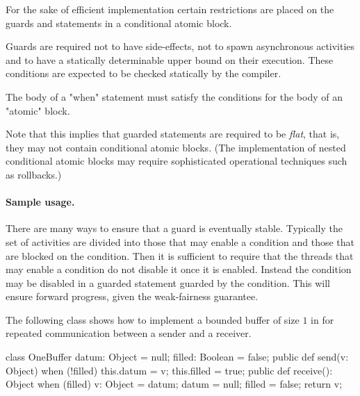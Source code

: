 {\begin{staticrule*}
For the sake of efficient implementation certain restrictions are
placed on the guards and statements in a conditional atomic
block. 
\end{staticrule*}

Guards are required not to have side-effects, not to spawn
asynchronous activities and to have a statically determinable upper
bound on their execution. These conditions are expected to be checked
statically by the compiler.

The body of a \xcd"when" statement must satisfy the conditions
for the body of an \xcd"atomic" block.

Note that this implies that guarded statements are required to be {\em
flat}, that is, they may not contain conditional atomic blocks. (The
implementation of nested conditional atomic blocks may require
sophisticated operational techniques such as rollbacks.)

\paragraph{Sample usage.} 
There are many ways to ensure that a guard is eventually
stable. Typically the set of activities are divided into those that
may enable a condition and those that are blocked on the
condition. Then it is sufficient to require that the threads that may
enable a condition do not disable it once it is enabled. Instead the
condition may be disabled in a guarded statement guarded by the
condition. This will ensure forward progress, given the weak-fairness
guarantee.

\begin{example}
The following class shows how to implement a bounded buffer of size
$1$ in \Xten{} for repeated communication between a sender and a
receiver.

\begin{xten}
class OneBuffer {
  datum: Object = null;
  filled: Boolean = false;
  public def send(v: Object) {
    when (!filled) {
      this.datum = v;
      this.filled = true;
    }
  }
  public def receive(): Object {
    when (filled) {
      v: Object = datum;
      datum = null;
      filled = false;
      return v;
    }
  }
}
\end{xten}
\end{example}

}
